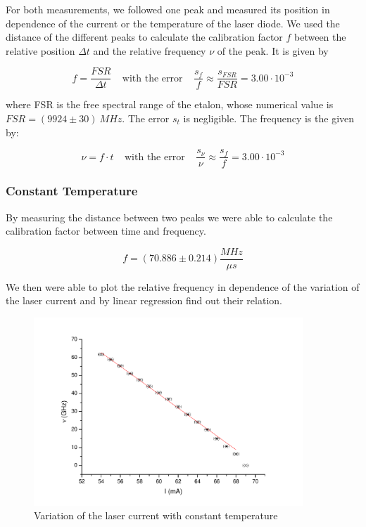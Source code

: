 For both measurements, we followed one peak and measured its position in dependence of the current or the temperature of the laser diode. We used the distance of the different peaks to calculate the calibration factor $f$ between the relative position $\Delta t$ and the relative frequency $\nu$ of the peak. It is given by

$$ f = \frac{FSR}{\Delta t} \ \ \ \ \ \text{with the error}\ \ \ \ \ \frac{s_f}{f} \approx \frac{s_{FSR}}{FSR} = 3.00 \cdot 10^{-3} $$

where FSR is the free spectral range of the etalon, whose numerical value is $FSR = (9924 \pm 30)\ MHz$. The error $s_t$ is negligible. The frequency is the given by:

$$\nu = f\cdot t \ \ \ \ \ \text{with the error}\ \ \ \ \ \frac{s_\nu}{\nu} \approx \frac{s_f}{f} = 3.00 \cdot 10^{-3} $$

\subsubsection{Constant Temperature}

By measuring the distance between two peaks we were able to calculate the calibration factor between time and frequency.

$$f = (70.886 \pm  0.214) \frac{MHz}{\mu s} $$

We then were able to plot the relative frequency in dependence of the variation of the laser current and by linear regression find out their relation.

\begin{figure}[H]
\centering \includegraphics[width=0.9\textwidth]{BilderAusw/T_fest.pdf}
\caption{Variation of the laser current with constant temperature}
\end{figure}

